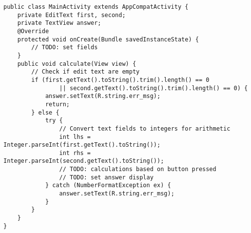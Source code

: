 \begin{lstlisting}[style=A_Java, caption={Assignment template}, label={listing:asigtemp}]
public class MainActivity extends AppCompatActivity {
    private EditText first, second;
    private TextView answer;
    @Override 
    protected void onCreate(Bundle savedInstanceState) {
    	// TODO: set fields
    }
    public void calculate(View view) {
    	// Check if edit text are empty
        if (first.getText().toString().trim().length() == 0
                || second.getText().toString().trim().length() == 0) {
            answer.setText(R.string.err_msg);
            return;
        } else {
            try {
            	// Convert text fields to integers for arithmetic
                int lhs = Integer.parseInt(first.getText().toString());
                int rhs = Integer.parseInt(second.getText().toString());
                // TODO: calculations based on button pressed
                // TODO: set answer display
            } catch (NumberFormatException ex) {
                answer.setText(R.string.err_msg);
            }
        }
    }
}
\end{lstlisting}
